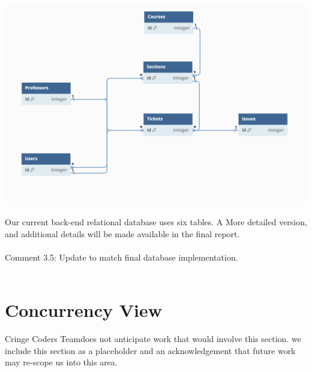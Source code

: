 \documentclass[oneside,openany,obeyspaces]{book}
\newcommand\tab[1][1cm]{\hspace*{#1}}
\newcommand\TeamName{Cringe Coders Team}
\begin{document}
\begin{flushleft}
    \includegraphics[width=160mm,scale=0.5]{img/relationship model.png}\\~\\


    \tab Our current back-end relational database uses six tables. A More detailed version, and additional details will be made available in the final report.\\~\\
    {\color{red}Comment 3.5: Update to match final database implementation. \\~\\}

    \section{Concurrency View}

    \tab \TeamName\space does not anticipate work that would involve this section. we include this section as a placeholder and an acknowledgement that future work may re-scope us into this area.\\~\\



\end{flushleft}
\end{document}
